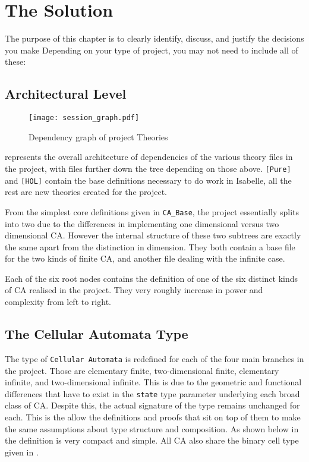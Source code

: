 \chapter{The Solution}

The purpose of this chapter is to clearly identify, discuss, and justify the decisions you make
Depending on your type of project, you may not need to include all of these:


\section{Architectural Level}

\begin{figure}[h]
    \centering
    \texttt{[image: session\_graph.pdf]}
    \caption{Dependency graph of project Theories}
    \label{fig:graph}
\end{figure}

 represents the overall architecture of dependencies of the various theory files in the project,
with files further down the tree depending on those above.
\texttt{[Pure]} and \texttt{[HOL]} contain the base definitions necessary to do work in Isabelle,
all the rest are new theories created for the project.

From the simplest core definitions given in \texttt{CA_Base},
the project essentially splits into two due to the differences in implementing one dimensional versus two dimensional CA.
However the internal structure of these two subtrees are exactly the same apart from the distinction in dimension.
They both contain a base file for the two kinds of finite CA,
and another file dealing with the infinite case.

Each of the six root nodes contains the definition of one of the six distinct kinds of CA realised in the project.
They very roughly increase in power and complexity from left to right.

\section{The Cellular Automata Type}

The type of \texttt{Cellular Automata} is redefined for each of the four main branches in the project.
Those are elementary finite,
two-dimensional finite,
elementary infinite,
and two-dimensional infinite.
This is due to the geometric and functional differences that have to exist in the \texttt{state} type parameter underlying each broad class of CA.
Despite this, the actual signature of the type remains unchanged for each.
This is the allow the definitions and proofs that sit on top of them to make the same assumptions about type structure and composition.
As shown below in  the definition is very compact and simple.
All CA also share the binary cell type given in .

